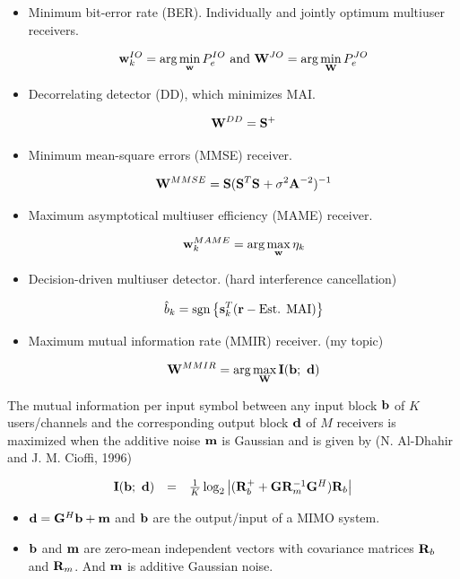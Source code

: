 \documentclass[20pt,landscape]{foils}
\newcommand{\br}{{\mathbf r}}
\newcommand{\bA}{{\mathbf A}}
\newcommand{\bb}{{\bf b}}
\newcommand{\bd}{{\bf d}}
\newcommand{\bs}{{\bf s}}
\newcommand{\bbm}{{\bf m}}
\newcommand{\bw}{{\bf w}}
\newcommand{\bG}{{\bf G}}
\newcommand{\bS}{{\bf S}}
\newcommand{\bI}{{\bf I}}
\newcommand{\bR}{{\bf R}}
\newcommand{\bW}{{\bf W}}
\begin{document}
\begin{itemize}
\item Minimum bit-error rate (BER). Individually and jointly
optimum multiuser receivers.

$$\bw_k^{IO} = \mbox{arg}\min_{\bw}P_e^{IO}\mbox{  and  }\bW^{JO} =
\mbox{arg}\min_{\bW}P_e^{JO}$$

\item Decorrelating detector (DD), which minimizes MAI.

$$\bW^{DD} = \bS^{+}$$

\item Minimum mean-square errors (MMSE) receiver.

$$\bW^{MMSE}=\bS(\bS^{T}\bS^{}+\sigma^2\bA^{-2})^{-1}$$

\end{itemize}

\begin{itemize}
\item Maximum asymptotical multiuser efficiency (MAME) receiver.

$$\bw_k^{MAME}=\mbox{arg}\max_{\bw}\eta_k$$

\item Decision-driven multiuser detector. (hard interference
cancellation)

$$\hat{b}_k=\mbox{sgn}\left\{\bs_k^T(\br-\mbox{Est. MAI})\right\}$$

\item Maximum mutual information rate (MMIR) receiver. (my topic)

$$\bW^{MMIR}=\mbox{arg}\max_{\bW}\bI(\bb;\ \bd)$$

\end{itemize}


The mutual information per input symbol between any input block
$\bb$ of $K$ users/channels and the corresponding output block
$\bd$ of $M$ receivers is maximized when the additive noise $\bbm$
is Gaussian and is given by (N. Al-Dhahir and J. M. Cioffi, 1996)

$$\begin{array}{rcl} \bI(\bb;\ \bd)&=& {1\over
K}\log_2\left|(\bR_b^{+}+\bG\bR_m^{-1}\bG^H)\bR_b\right|
\end{array}$$

\begin{itemize}
\item $\bd =\bG^H\bb+\bbm$ and $\bb$ are the output/input of a
MIMO system.

\item $\bb$ and $\bbm$ are zero-mean independent vectors with
covariance matrices $\bR_b$ and $\bR_m$. And $\bbm$ is additive
Gaussian noise.
\end{itemize}
\end{document}
